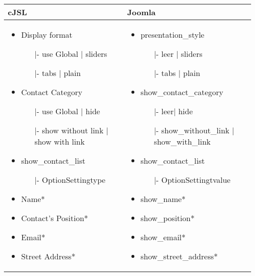 \begin{minipage}{0.6\textwidth}
\begin{longtable}{|p{} | p{}|}
\hline
\textbf{cJSL} & \textbf{Joomla} \\ 
\hline
 \begin{itemize}
\item Display format
	\begin{enumerate}
	\item[|-] use Global | sliders
	\item[|-] tabs | plain
	\end{enumerate}
\item Contact Category
	\begin{enumerate}
	\item[|-] use Global | hide
	\item[|-] show without link | show with link
	\end{enumerate} 
\item show\_contact\_list
	\begin{enumerate}
		\item[|-] OptionSettingtype
	\end{enumerate} 
\item Name* 
\item Contact's Position* 
\item Email* 
\item Street Address* 
\end{itemize}
 & 
 \begin{itemize}
\item presentation\_style
\begin{enumerate}
	\item[|-] leer | sliders
	\item[|-] tabs | plain
	\end{enumerate} 
\item show\_contact\_category
\begin{enumerate}
	\item[|-]leer| hide
	\item[|-]show\_without\_link | show\_with\_link
	\end{enumerate} 
\item show\_contact\_list
\begin{enumerate}
		\item[|-] OptionSettingtvalue
	\end{enumerate} 
\item show\_name* 
\item show\_position* 
\item show\_email* 
\item show\_street\_address* 
\end{itemize}
\\
\hline
\end{longtable}
\end{minipage}

